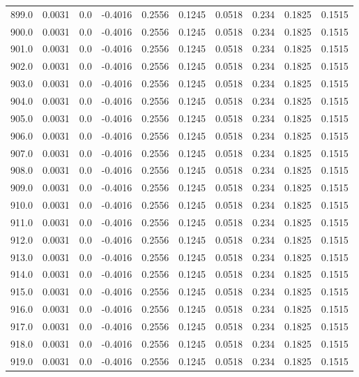 \begin{longtable}{lrrrrrrrrr}
899.0 & 0.0031 & 0.0 & -0.4016 & 0.2556 & 0.1245 & 0.0518 & 0.234 & 0.1825 & 0.1515 \\
900.0 & 0.0031 & 0.0 & -0.4016 & 0.2556 & 0.1245 & 0.0518 & 0.234 & 0.1825 & 0.1515 \\
901.0 & 0.0031 & 0.0 & -0.4016 & 0.2556 & 0.1245 & 0.0518 & 0.234 & 0.1825 & 0.1515 \\
902.0 & 0.0031 & 0.0 & -0.4016 & 0.2556 & 0.1245 & 0.0518 & 0.234 & 0.1825 & 0.1515 \\
903.0 & 0.0031 & 0.0 & -0.4016 & 0.2556 & 0.1245 & 0.0518 & 0.234 & 0.1825 & 0.1515 \\
904.0 & 0.0031 & 0.0 & -0.4016 & 0.2556 & 0.1245 & 0.0518 & 0.234 & 0.1825 & 0.1515 \\
905.0 & 0.0031 & 0.0 & -0.4016 & 0.2556 & 0.1245 & 0.0518 & 0.234 & 0.1825 & 0.1515 \\
906.0 & 0.0031 & 0.0 & -0.4016 & 0.2556 & 0.1245 & 0.0518 & 0.234 & 0.1825 & 0.1515 \\
907.0 & 0.0031 & 0.0 & -0.4016 & 0.2556 & 0.1245 & 0.0518 & 0.234 & 0.1825 & 0.1515 \\
908.0 & 0.0031 & 0.0 & -0.4016 & 0.2556 & 0.1245 & 0.0518 & 0.234 & 0.1825 & 0.1515 \\
909.0 & 0.0031 & 0.0 & -0.4016 & 0.2556 & 0.1245 & 0.0518 & 0.234 & 0.1825 & 0.1515 \\
910.0 & 0.0031 & 0.0 & -0.4016 & 0.2556 & 0.1245 & 0.0518 & 0.234 & 0.1825 & 0.1515 \\
911.0 & 0.0031 & 0.0 & -0.4016 & 0.2556 & 0.1245 & 0.0518 & 0.234 & 0.1825 & 0.1515 \\
912.0 & 0.0031 & 0.0 & -0.4016 & 0.2556 & 0.1245 & 0.0518 & 0.234 & 0.1825 & 0.1515 \\
913.0 & 0.0031 & 0.0 & -0.4016 & 0.2556 & 0.1245 & 0.0518 & 0.234 & 0.1825 & 0.1515 \\
914.0 & 0.0031 & 0.0 & -0.4016 & 0.2556 & 0.1245 & 0.0518 & 0.234 & 0.1825 & 0.1515 \\
915.0 & 0.0031 & 0.0 & -0.4016 & 0.2556 & 0.1245 & 0.0518 & 0.234 & 0.1825 & 0.1515 \\
916.0 & 0.0031 & 0.0 & -0.4016 & 0.2556 & 0.1245 & 0.0518 & 0.234 & 0.1825 & 0.1515 \\
917.0 & 0.0031 & 0.0 & -0.4016 & 0.2556 & 0.1245 & 0.0518 & 0.234 & 0.1825 & 0.1515 \\
918.0 & 0.0031 & 0.0 & -0.4016 & 0.2556 & 0.1245 & 0.0518 & 0.234 & 0.1825 & 0.1515 \\
919.0 & 0.0031 & 0.0 & -0.4016 & 0.2556 & 0.1245 & 0.0518 & 0.234 & 0.1825 & 0.1515 \\

\end{longtable}

